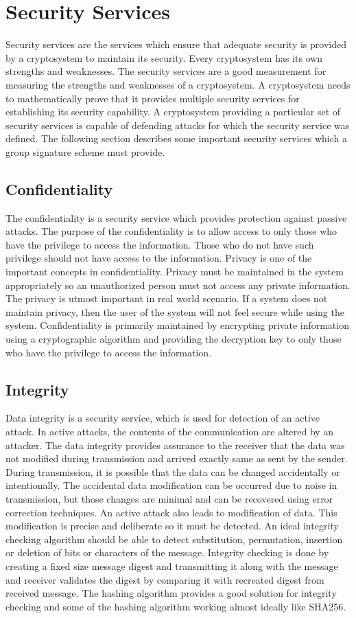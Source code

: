 \section{Security Services}
Security services are the services which ensure that adequate security is provided by a cryptosystem to maintain its security. Every cryptosystem has its own strengths and weaknesses. The security services are a good measurement for measuring the strengths and weaknesses of a cryptosystem. A cryptosystem needs to mathematically prove that it provides multiple security services for establishing its security capability. A cryptosystem providing a particular set of security services is capable of defending attacks for which the security service was defined. The following section describes some important security services which a group signature scheme must provide.
 
\subsection{Confidentiality} 
The confidentiality is a security service which provides protection against passive attacks. The purpose of the confidentiality is to allow access to only those who have the privilege to access the information. Those who do not have such privilege should not have access to the information. Privacy is one of the important concepts in confidentiality. Privacy must be maintained in the system appropriately so an unauthorized person must not access any private information. The privacy is utmost important in real world scenario. If a system does not maintain privacy, then the user of the system will not feel secure while using the system. Confidentiality is primarily maintained by encrypting private information using a cryptographic algorithm and providing the decryption key to only those who have the privilege to access the information.
\subsection{Integrity}
Data integrity is a security service, which is used for detection of an active attack. In active attacks, the contents of the communication are altered by an attacker. The data integrity provides assurance to the receiver that the data was not modified during transmission and arrived exactly same as sent by the sender. During transmission, it is possible that the data can be changed accidentally or intentionally. The accidental data modification can be occurred due to noise in transmission, but those changes are minimal and can be recovered using error correction techniques. An active attack also leads to modification of data. This modification is precise and deliberate so it must be detected. An ideal integrity checking algorithm should be able to detect substitution, permutation, insertion or deletion of bits or characters of the message. Integrity checking is done by creating a fixed size message digest and transmitting it along with the message and receiver validates the digest by comparing it with recreated digest from received message. The hashing algorithm provides a good solution for integrity checking and some of the hashing algorithm working almost ideally like SHA256.
